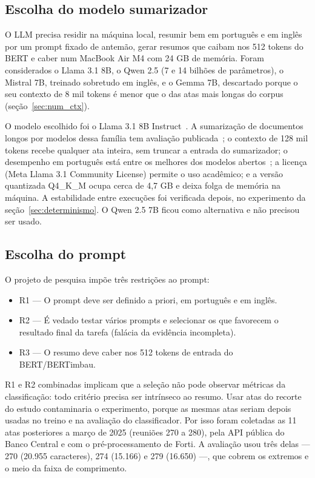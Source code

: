 \documentclass[12pt]{article}
\begin{document}
\subsection{Escolha do modelo sumarizador}\label{sec:escolha-llm}

O LLM precisa residir na máquina local, resumir bem em português e em inglês por
um prompt fixado de antemão, gerar resumos que caibam nos 512 tokens do BERT e
caber num MacBook Air M4 com 24 GB de memória. Foram considerados o Llama 3.1
8B, o Qwen 2.5 (7 e 14 bilhões de parâmetros), o Mistral 7B, treinado sobretudo
em inglês, e o Gemma 7B, descartado porque o seu contexto de 8 mil tokens é
menor que o das atas mais longas do corpus (seção~\ref{sec:num_ctx}).

O modelo escolhido foi o Llama 3.1 8B Instruct~\cite{grattafiori2024}. A
sumarização de documentos longos por modelos dessa família tem avaliação
publicada~\cite{rehman2025}; o contexto de 128 mil tokens recebe
qualquer ata inteira, sem truncar a entrada do sumarizador; o desempenho em
português está entre os melhores dos modelos abertos~\cite{almeida2025}; a
licença (Meta Llama 3.1 Community License) permite o uso acadêmico; e a versão
quantizada Q4\_K\_M ocupa cerca de 4,7 GB e deixa folga de memória na máquina.
A estabilidade entre execuções foi verificada depois, no experimento da
seção~\ref{sec:determinismo}. O Qwen 2.5 7B ficou como alternativa e não
precisou ser usado.

\subsection{Escolha do prompt}\label{sec:prompt}

O projeto de pesquisa impõe três restrições ao prompt:

\begin{itemize}
\item R1 --- O prompt deve ser definido a priori, em português e em inglês.
\item R2 --- É vedado testar vários prompts e selecionar os que favorecem o
  resultado final da tarefa (falácia da evidência incompleta).
\item R3 --- O resumo deve caber nos 512 tokens de entrada do BERT/BERTimbau.
\end{itemize}

R1 e R2 combinadas implicam que a seleção não pode observar métricas da
classificação: todo critério precisa ser intrínseco ao resumo. Usar atas do
recorte do estudo contaminaria o experimento, porque as mesmas atas seriam
depois usadas no treino e na avaliação do classificador. Por isso foram
coletadas as 11 atas posteriores a março de 2025 (reuniões 270 a 280), pela API
pública do Banco Central e com o pré-processamento de Forti. A avaliação usou
três delas --- 270 (20.955 caracteres), 274 (15.166) e 279 (16.650) ---, que
cobrem os extremos e o meio da faixa de comprimento.
\end{document}
